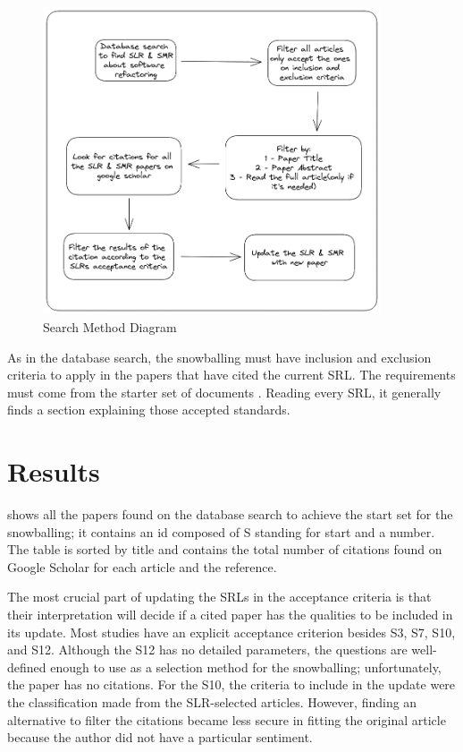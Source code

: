 \begin{figure}[ht!]
\SetCaptionWidth{\textwidth}
\caption{Search Method Diagram}
\label{fig-snow}
\includegraphics[width =100mm]{Chapter-3/Figures/snowballing_diagram.png}
\end{figure}

As in the database search, the snowballing must have inclusion and exclusion criteria to apply in the papers that have cited the current SRL. The requirements must come from the starter set of documents \cite{Wohlin2020}. Reading every SRL, it generally finds a section explaining those accepted standards.


\section{Results}
\label{sec-results}
 shows all the papers found on the database search to achieve the start set for the snowballing; it contains an id composed of S standing for start and a number. The table is sorted by title and contains the total number of citations found on Google Scholar for each article and the reference.



The most crucial part of updating the SRLs in the acceptance criteria is that their interpretation will decide if a cited paper has the qualities to be included in its update. Most studies have an explicit acceptance criterion besides S3, S7, S10, and S12. Although the S12 has no detailed parameters, the questions are well-defined enough to use as a selection method for the snowballing; unfortunately, the paper has no citations. For the S10, the criteria to include in the update were the classification made from the SLR-selected articles. However, finding an alternative to filter the citations became less secure in fitting the original article because the author did not have a particular sentiment. 


